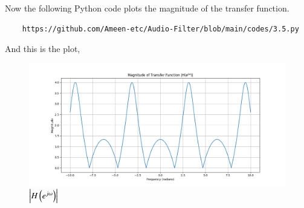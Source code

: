 \documentclass[journal,12pt,twocolumn]{IEEEtran}
\theoremstyle{remark}
\begin{document}
\begin{enumerate}[label=\thesection.\arabic*]
Now the following Python code plots the magnitude of the transfer function.
\begin{lstlisting}
    https://github.com/Ameen-etc/Audio-Filter/blob/main/codes/3.5.py
\end{lstlisting}
And this is the plot,
\begin{figure}[h!]
    \centering
    \includegraphics[width=\columnwidth]{figs/3.5.png}
    \caption{$\left|H\left(e^{j\omega}\right)\right|$}
    \label{fig:tfm}
\end{figure}
\end{enumerate}
\end{document}
